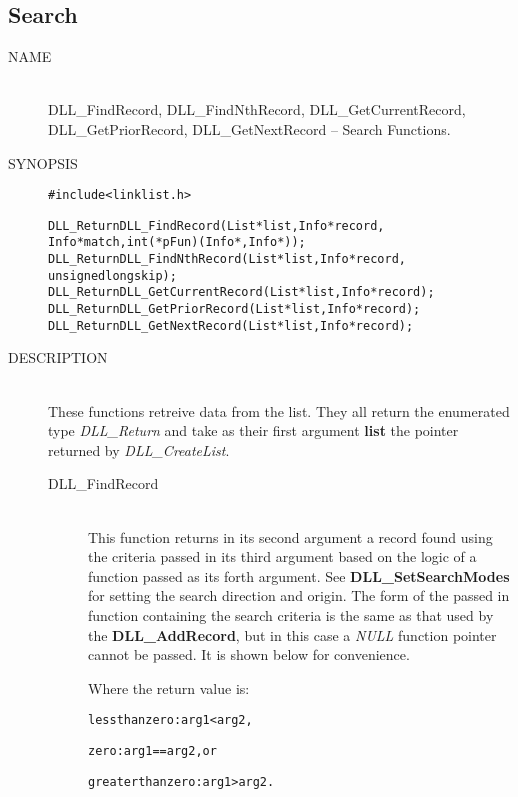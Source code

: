 \documentclass[10pt,letterpaper,titlepage]{article}
\begin{document}
\subsection{Search}
\begin{description}
\item[NAME]\quad\\
DLL\_FindRecord, DLL\_FindNthRecord, DLL\_GetCurrentRecord,\\
DLL\_GetPriorRecord, DLL\_GetNextRecord -- Search Functions.

\item[SYNOPSIS]
\begin{alltt}

#include <linklist.h>

DLL_Return DLL_FindRecord(List *list, Info *record,
            Info *match, int (*pFun)(Info *, Info *));
DLL_Return DLL_FindNthRecord(List *list, Info *record,
            unsigned long skip);
DLL_Return DLL_GetCurrentRecord(List *list, Info *record);
DLL_Return DLL_GetPriorRecord(List *list, Info *record);
DLL_Return DLL_GetNextRecord(List *list, Info *record);
\end{alltt}

\item[DESCRIPTION]\quad\\
These functions retreive data from the list.  They all return the enumerated type \emph{DLL\_Return} and take as their first argument \textbf{list} the pointer returned by \emph{DLL\_CreateList}.

 \begin{description}
 \item[DLL\_FindRecord]\quad\\
 This function returns in its second argument a record found using the criteria passed in its third argument based on the logic of a function passed as its forth argument.  See \textbf{DLL\_SetSearchModes} for setting the search direction and origin.  The form of the passed in function containing the search criteria is the same as that used by the \textbf{DLL\_AddRecord}, but in this case a \emph{NULL} function pointer cannot be passed.  It is shown below for convenience.
 \vspace{8pt}

 Where the return value is:
 \begin{alltt}
   less than zero:     arg1 < arg2,

   zero:               arg1 == arg2, or

   greater than zero:  arg1 > arg2.
 \end{alltt}


\end{description}
\end{description}
\end{document}
